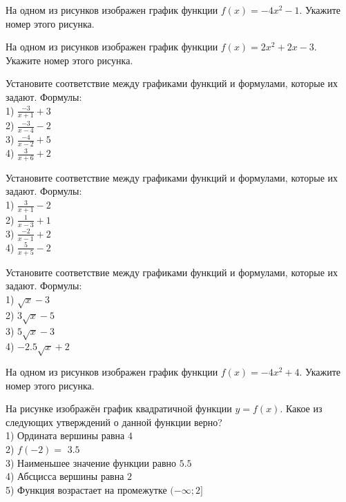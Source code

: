\documentclass[4apaper]{article}
\begin{document}
\begin{taskBN}{26}
На одном из рисунков изображен график функции $f(x)=-4x^2-1$. Укажите номер этого рисунка.
\end{taskBN}

\begin{taskBN}{27}
На одном из рисунков изображен график функции $f(x)=2x^2+2x-3$. Укажите номер этого рисунка.
\end{taskBN}

\begin{taskBN}{28}
Установите соответствие между графиками функций и формулами, которые их задают. Формулы: \\1) $\frac{-3}{x+1}+3$\\2) $\frac{-3}{x-4}-2$\\3) $\frac{-4}{x-2}+5$\\4) $\frac{3}{x+6}+2$
\end{taskBN}

\begin{taskBN}{29}
Установите соответствие между графиками функций и формулами, которые их задают. Формулы: \\1) $\frac{3}{x+1}-2$\\2) $\frac{1}{x-3}+1$\\3) $\frac{-2}{x-1}+2$\\4) $\frac{5}{x+5}-2$
\end{taskBN}

\begin{taskBN}{30}
Установите соответствие между графиками функций и формулами, которые их задают. Формулы: \\1) $\sqrt{x}-3$\\2) $3\sqrt{x}-5$\\3) $5\sqrt{x}-3$\\4) $-2.5\sqrt{x}+2$
\end{taskBN}

\begin{taskBN}{31}
На одном из рисунков изображен график функции $f(x)=-4x^2+4$. Укажите номер этого рисунка.
\end{taskBN}

\begin{taskBN}{32}
На рисунке изображён график квадратичной функции $y=f(x)$. Какое из следующих утверждений о данной функции верно?\\1) Ордината вершины равна $4$\\2) $f(-2)=$ $3.5$\\3) Наименьшее значение функции равно  $5.5$\\4) Абсцисса вершины равна $2$\\5) Функция возрастает на промежутке $(-\infty;2]$
\end{taskBN}
\end{document}
